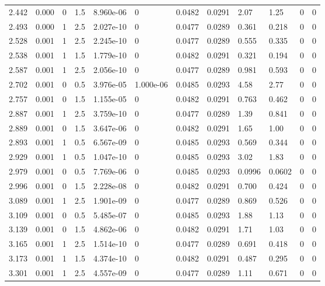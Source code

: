 \documentclass[preview]{standalone}
\begin{document}
{{{\begin{tabular}{L{1.2cm}C{1.2cm} C{0.3cm}C{0.5cm} C{1.4cm}C{1.4cm} C{1.4cm}C{1.4cm} C{1.6cm}C{1.6cm} C{1.6cm}C{1.6cm}}
  2.442  &  0.000  & 0     & 1.5 &  8.960e-06  & 0  &  0.0482&   0.0291& 2.07 & 1.25   &  0 & 0  \\ 
  2.493  &  0.000  & 1     & 2.5 &  2.027e-10  & 0  &  0.0477&   0.0289& 0.361 & 0.218   &  0 & 0  \\ 
  2.528  &  0.001  & 1     & 2.5 &  2.245e-10  & 0  &  0.0477&   0.0289& 0.555 & 0.335   &  0 & 0  \\ 
  2.538  &  0.001  & 1     & 1.5 &  1.779e-10  & 0  &  0.0482&   0.0291& 0.321 & 0.194   &  0 & 0  \\ 
  2.587  &  0.001  & 1     & 2.5 &  2.056e-10  & 0  &  0.0477&   0.0289& 0.981 & 0.593   &  0 & 0  \\ 
  2.702  &  0.001  & 0     & 0.5 &  3.976e-05  & 1.000e-06  &  0.0485&   0.0293& 4.58 & 2.77   &  0 & 0  \\ 
  2.757  &  0.001  & 0     & 1.5 &  1.155e-05  & 0  &  0.0482&   0.0291& 0.763 & 0.462   &  0 & 0  \\ 
  2.887  &  0.001  & 1     & 2.5 &  3.759e-10  & 0  &  0.0477&   0.0289& 1.39 & 0.841   &  0 & 0  \\ 
  2.889  &  0.001  & 0     & 1.5 &  3.647e-06  & 0  &  0.0482&   0.0291& 1.65 & 1.00   &  0 & 0  \\ 
  2.893  &  0.001  & 1     & 0.5 &  6.567e-09  & 0  &  0.0485&   0.0293& 0.569 & 0.344   &  0 & 0  \\ 
  2.929  &  0.001  & 1     & 0.5 &  1.047e-10  & 0  &  0.0485&   0.0293& 3.02 & 1.83   &  0 & 0  \\ 
  2.979  &  0.001  & 0     & 0.5 &  7.769e-06  & 0  &  0.0485&   0.0293& 0.0996 & 0.0602   &  0 & 0  \\ 
  2.996  &  0.001  & 0     & 1.5 &  2.228e-08  & 0  &  0.0482&   0.0291& 0.700 & 0.424   &  0 & 0  \\ 
  3.089  &  0.001  & 1     & 2.5 &  1.901e-09  & 0  &  0.0477&   0.0289& 0.869 & 0.526   &  0 & 0  \\ 
  3.109  &  0.001  & 0     & 0.5 &  5.485e-07  & 0  &  0.0485&   0.0293& 1.88 & 1.13   &  0 & 0  \\ 
  3.139  &  0.001  & 0     & 1.5 &  4.862e-06  & 0  &  0.0482&   0.0291& 1.71 & 1.03   &  0 & 0  \\ 
  3.165  &  0.001  & 1     & 2.5 &  1.514e-10  & 0  &  0.0477&   0.0289& 0.691 & 0.418   &  0 & 0  \\ 
  3.173  &  0.001  & 1     & 1.5 &  4.374e-10  & 0  &  0.0482&   0.0291& 0.487 & 0.295   &  0 & 0  \\ 
  3.301  &  0.001  & 1     & 2.5 &  4.557e-09  & 0  &  0.0477&   0.0289& 1.11 & 0.671   &  0 & 0  \\ 

\end{tabular}}}}
\end{document}
